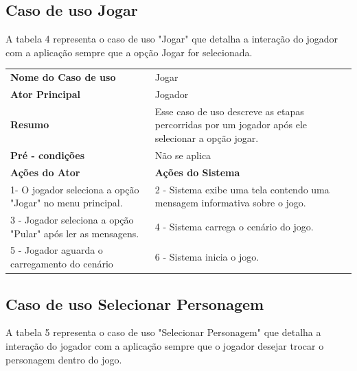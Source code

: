\subsection{Caso de uso Jogar}
A tabela 4 representa o caso de uso "Jogar" que detalha a interação do jogador com a aplicação sempre que a opção Jogar for selecionada.

\begin{table} [h!]
\centering 
{} 
\begin{tabular}{ | m{5cm} | m{8cm}| }  
\hline 
\textbf {Nome do Caso de uso} & Jogar \\ 
\textbf {Ator Principal} & Jogador \\  
\textbf {Resumo} & Esse caso de uso descreve as etapas percorridas por um jogador após ele selecionar a opção jogar. \\ 
\textbf {Pré - condições} & Não se aplica\\ 
\hline 
\textbf {Ações do Ator} & \textbf {Ações do Sistema}\\ 
\hline 
1- O jogador seleciona a opção "Jogar" no menu principal. & 2 - Sistema exibe uma tela contendo uma mensagem informativa sobre o jogo.\\ 
3 - Jogador seleciona a opção "Pular" após ler as mensagens. & 4 - Sistema carrega o cenário do jogo.\\
5 - Jogador aguarda o carregamento do cenário & 6 - Sistema inicia o jogo.\\
\hline 
\end{tabular} 
\end{table}

\subsection{Caso de uso Selecionar Personagem} 
A tabela 5 representa o caso de uso "Selecionar Personagem" que detalha a interação do jogador com a aplicação sempre que o jogador desejar trocar o personagem dentro do jogo.

